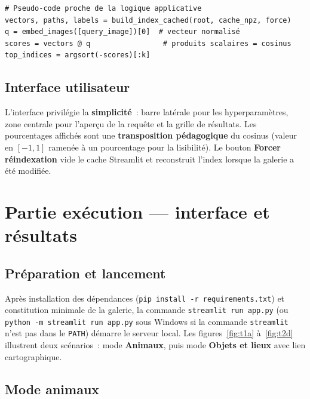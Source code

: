 \documentclass[11pt,a4paper,openany]{report}
\begin{document}
\begin{lstlisting}[caption={Schéma simplifié de la boucle de recherche (conceptuel).}, label={lst:loop}]
# Pseudo-code proche de la logique applicative
vectors, paths, labels = build_index_cached(root, cache_npz, force)
q = embed_images([query_image])[0]  # vecteur normalisé
scores = vectors @ q                 # produits scalaires = cosinus
top_indices = argsort(-scores)[:k]
\end{lstlisting}

\section{Interface utilisateur}

L'interface privilégie la \textbf{simplicité}~: barre latérale pour les hyperparamètres, zone centrale pour l'aperçu de la requête et la grille de résultats. Les pourcentages affichés sont une \textbf{transposition pédagogique} du cosinus (valeur en $[-1,1]$ ramenée à un pourcentage pour la lisibilité). Le bouton \textbf{Forcer réindexation} vide le cache Streamlit et reconstruit l'index lorsque la galerie a été modifiée.

\chapter{Partie exécution — interface et résultats}

\section{Préparation et lancement}

Après installation des dépendances (\texttt{pip install -r requirements.txt}) et constitution minimale de la galerie, la commande \texttt{streamlit run app.py} (ou \texttt{python -m streamlit run app.py} sous Windows si la commande \texttt{streamlit} n'est pas dans le \texttt{PATH}) démarre le serveur local. Les figures~\ref{fig:t1a} à~\ref{fig:t2d} illustrent deux scénarios~: mode \textbf{Animaux}, puis mode \textbf{Objets et lieux} avec lien cartographique.

\section{Mode animaux}
\end{document}
